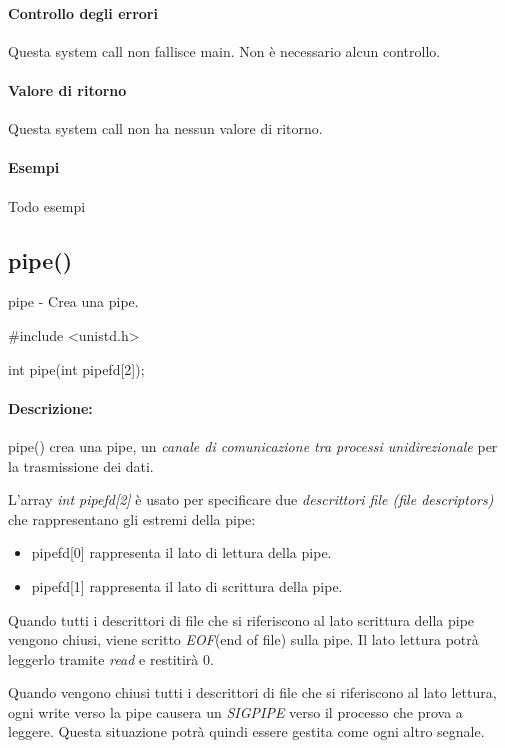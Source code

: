 \documentclass
[10pt,        %
 a4paper,     %
 onecolumn,   %
 fleqn,       %
 oneside,     %
 notitlepage, %
]{article}    %
\begin{document}
\paragraph{Controllo degli errori}
Questa system call non fallisce main. Non è necessario alcun controllo.

\paragraph{Valore di ritorno}
Questa system call non ha nessun valore di ritorno.

\paragraph{Esempi}
Todo esempi

\subsection{pipe()}
pipe - Crea una pipe.
\begin{C}[name=pipe()]
#include <unistd.h>

int pipe(int pipefd[2]);
\end{C}

\paragraph{Descrizione:}
pipe() crea una pipe, un \textit{canale di comunicazione tra processi unidirezionale} per la trasmissione dei dati. 

L'array \textit{int pipefd[2]} è usato per specificare due \textit{descrittori file (file descriptors)} che rappresentano gli estremi della pipe:
\begin{itemize}
    \item pipefd[0] rappresenta il lato di lettura della pipe.
    \item pipefd[1] rappresenta il lato di scrittura della pipe.
\end{itemize}

Quando tutti i descrittori di file che si riferiscono al lato scrittura della pipe vengono chiusi, viene scritto \textit{EOF}(end of file) sulla pipe. Il lato lettura potrà leggerlo tramite \textit{read} e restitirà 0.



Quando vengono chiusi tutti i descrittori di file che si riferiscono al lato lettura, ogni write verso la pipe causera un \textit{SIGPIPE} verso il processo che prova a leggere. Questa situazione potrà quindi essere gestita come ogni altro segnale.
\end{document}
